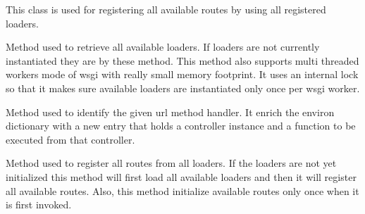 \documentclass[letterpaper,10pt,english]{sphinxmanual}
\begin{document}
\begin{fulllineitems}
\label{features/routing_engine:fantastico.routing_engine.router.Router}
This class is used for registering all available routes by using all registered loaders.

\begin{fulllineitems}
\label{features/routing_engine:fantastico.routing_engine.router.Router.get_loaders}
Method used to retrieve all available loaders. If loaders are not currently instantiated they are by these method.
This method also supports multi threaded workers mode of wsgi with really small memory footprint. It uses an internal
lock so that it makes sure available loaders are instantiated only once per wsgi worker.

\end{fulllineitems}


\begin{fulllineitems}
\label{features/routing_engine:fantastico.routing_engine.router.Router.handle_route}
Method used to identify the given url method handler. It enrich the environ dictionary with a new entry that
holds a controller instance and a function to be executed from that controller.

\end{fulllineitems}


\begin{fulllineitems}
\label{features/routing_engine:fantastico.routing_engine.router.Router.register_routes}
Method used to register all routes from all loaders. If the loaders are not yet initialized this method will first
load all available loaders and then it will register all available routes. Also, this method initialize available routes
only once when it is first invoked.

\end{fulllineitems}


\end{fulllineitems}
\end{document}
